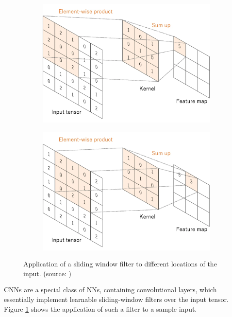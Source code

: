 \begin{figure}
	\centering
	\begin{subfigure}[b]{0.47\linewidth}
		\includegraphics[width=\textwidth]{plots/convolutional-layer_1.png}
	\end{subfigure}
	\hfill
	\begin{subfigure}[b]{0.47\linewidth}
		\includegraphics[width=\textwidth]{plots/convolutional-layer_2.png}
	\end{subfigure}
	\caption{Application of a sliding window filter to different locations of the input. (source: \cite{convolutional-layer-plot})}
	\label{fig:convolutional-layer}
\end{figure}

\glspl{CNN} are a special class of \glspl{NN}, containing convolutional layers, which essentially implement learnable sliding-window filters over the input tensor. Figure \ref{fig:convolutional-layer} shows the application of such a filter to a sample input.

